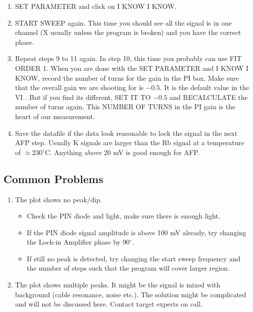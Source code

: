 {\begin{enumerate}
\item SET PARAMETER and  click on I KNOW I KNOW.

\item START SWEEP again. This time you should see all the signal is in one 
channel (X usually unless the program is broken) and you have the correct 
phase.

\item Repeat steps 9 to 11 again. In step 10, this time you probably 
can use FIT ORDER 1.
When you are done with the SET PARAMETER and I KNOW I KNOW, record the number 
of turns for the gain in the PI box. Make sure that the overall gain we are 
shooting for is $-0.5$. It is the default value in the VI . But if you find 
its different, SET IT TO $-0.5$ and RECALCULATE the number of turns again. 
This NUMBER OF TURNS in the PI gain is the heart of our measurement.

\item Save the datafile if the data look reasonable to lock the signal in the 
next AFP step. Usually K signals are larger than the Rb signal at a
temperature of $\approx 230^\circ$C. Anything above 20 mV is good enough 
for AFP.   

\end{enumerate}

\subsection{Common Problems}
\begin{enumerate}

\item The plot shows no peak/dip. 
\begin{itemize}
\item Check the PIN diode and light, make sure there is enough light.
\item  If the PIN diode signal amplitude is above 100 mV already, try changing the 
Lock-in Amplifier phase by 90$^\circ$.
\item  If still no peak is detected, try changing the 
start sweep frequency and the number of steps such that the program
will cover larger region.
\end{itemize}

\item The plot shows multiple peaks.  It might be the signal is mixed with 
background (cable resonance, noise etc.).  The solution might be complicated
and will not be discussed here.  Contact target experts on call.



\end{enumerate}}
